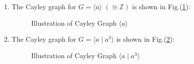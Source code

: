 \begin{example}
\begin{enumerate}
\item
The Cayley graph for $G=\langle a\rangle$ $(\cong\mathbb{Z})$ is shown in Fig.(\ref{Fig:11:3}):
\begin{figure}[H]
	\caption{Illustration of Cayley Graph $\langle a\rangle$}
	\label{Fig:11:3}
\end{figure}
\item
The Cayley graph for $G=\langle a\mid a^3\rangle$ is shown in Fig.(\ref{Fig:11:5}):
\begin{figure}[H]
	\caption{Illustration of Cayley Graph $\langle a\mid a^3\rangle$}
	\label{Fig:11:5}
\end{figure}


\end{enumerate}
\end{example}
